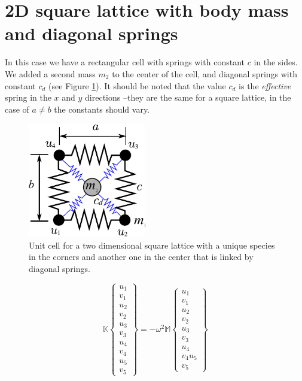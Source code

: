 \documentclass[12pt,letterpaper]{article}
\begin{document}
\section{2D square lattice with body mass and diagonal springs}
In this case we have a rectangular cell with springs with constant $c$ in the sides. We added a second mass $m_2$ to the center of the cell, and diagonal springs with constant $c_d$ (see Figure \ref{fig:square-bcc}). It should be noted that the value $c_d$ is the \emph{effective} spring in the $x$ and $y$ directions --they are the same for a square lattice, in the case of $a\neq b$ the constants should vary.
\begin{figure}[h]
\centering
\includegraphics[height=5cm]{img/spring-square-bcc.pdf} 
\caption{Unit cell for a two dimensional square lattice with a unique species in the corners and another one in the center that is linked by diagonal springs.}\label{fig:square-bcc}
\end{figure}
\begin{equation}
\mathbb{K}
\left\lbrace \begin{array}{c}
u_1 \\ 
v_1 \\ 
u_2 \\ 
v_2 \\ 
u_3 \\ 
v_3 \\ 
u_4 \\ 
v_4 \\
u_5 \\
v_5
\end{array}  \right\rbrace= -\omega^2 \mathbb{M}
\left\lbrace \begin{array}{c}
u_1 \\ 
v_1 \\ 
u_2 \\ 
v_2 \\ 
u_3 \\ 
v_3 \\ 
u_4 \\ 
v_4
u_5 \\
v_5
\end{array} \right\rbrace
\end{equation}
\end{document}
